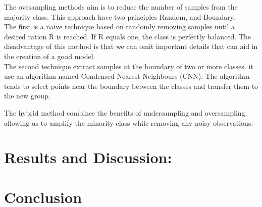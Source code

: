 \documentclass[conference]{IEEEtran}
\begin{document}
	The ovesampling method\textquotesingle s aim is to reduce the number of samples from the majority class. This approach have two principles Random, and Boundary.\\
	
	The first is a naive technique based on randomly removing samples until a desired ration R is reached. If R equals one, the class is perfectly balanced. The disadvantage of this method is that we can omit important details that can aid in the creation of a good model.\\
	
	The second technique extract samples at the boundary of two or more classes. it use an algorithm named Condensed Nearest Neighbours (CNN). The algorithm tends to select points near the boundary between the classes and transfer them to the new group. 
	
	
	The hybrid method combines the benefits of undersampling and oversampling, allowing us to amplify the minority class while removing any noisy observations. 
	
	

	

	\section{Results and Discussion:}\label{AA}
	\section{Conclusion}
	
	
	
	
	
\end{document}
